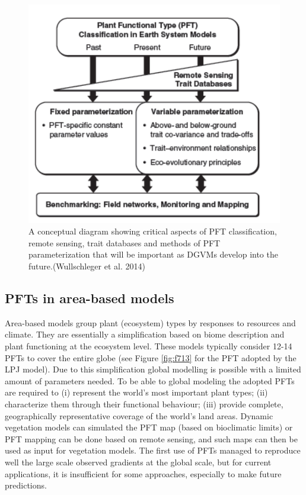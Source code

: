 \documentclass[12pt,oneside]{book}
\begin{document}
\begin{figure}

{\centering \includegraphics[width=0.8\linewidth]{figures/chap7/f712_pft_wullschleger} 

}

\caption{A conceptual diagram showing critical aspects of PFT classification, remote sensing, trait databases and methods of PFT parameterization that will be important as DGVMs develop into the future.(Wullschleger et al. 2014)}\label{fig:f712}
\end{figure}

\subsection{PFTs in area-based models}\label{pfts-in-area-based-models}

Area-based models group plant (ecosystem) types by responses to
resources and climate. They are essentially a simplification based on
biome description and plant functioning at the ecosystem level. These
models typically consider 12-14 PFTs to cover the entire globe (see
Figure \ref{fig:f713} for the PFT adopted by the LPJ model). Due to this
simplification global modelling is possible with a limited amount of
parameters needed. To be able to global modeling the adopted PFTs are
required to (i) represent the world's most important plant types; (ii)
characterize them through their functional behaviour; (iii) provide
complete, geographically representative coverage of the world's land
areas. Dynamic vegetation models can simulated the PFT map (based on
bioclimatic limits) or PFT mapping can be done based on remote sensing,
and such maps can then be used as input for vegetation models. The first
use of PFTs managed to reproduce well the large scale observed gradients
at the global scale, but for current applications, it is insufficient
for some approaches, especially to make future predictions.
\end{document}
